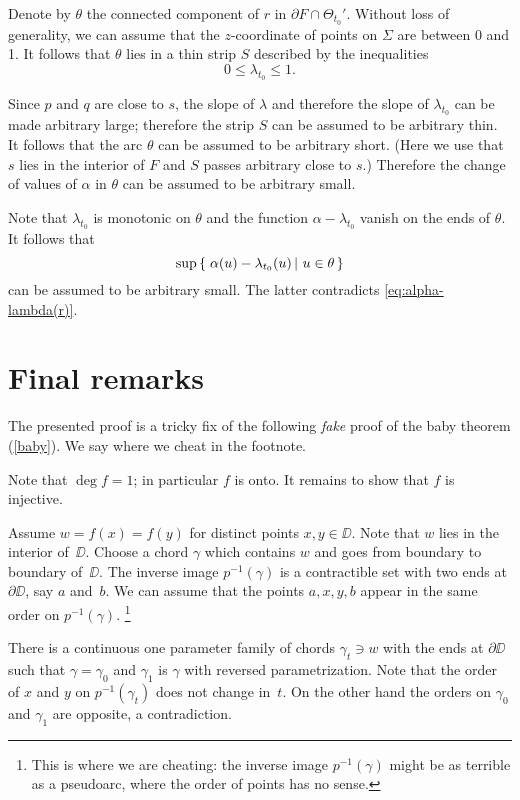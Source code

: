 \documentclass{article}
\begin{document}
Denote by $\theta$ the connected component of $r$ in $\partial F\cap \Theta_{t_0}'$.
Without loss of generality, we can assume that the $z$-coordinate of points on $\Sigma$ are between 0 and 1.
It follows that $\theta$ lies in a thin strip $S$ described by the inequalities
\[0\le \lambda_{t_0}\le 1.\]

Since $p$ and $q$ are close to $s$, 
 the slope of $\lambda$ and therefore the slope of $\lambda_{t_0}$ can be made arbitrary large;
therefore the strip $S$ can be assumed to be arbitrary thin.
It follows that the arc $\theta$ can be assumed to be  arbitrary short.
(Here we use that $s$ lies in the interior of $F$ and $S$ passes arbitrary close to $s$.)
Therefore the change of values of $\alpha$ in $\theta$ can be assumed to be arbitrary small.

Note that $\lambda_{t_0}$ is monotonic on $\theta$ and 
the function $\alpha-\lambda_{t_0}$ vanish on the ends of $\theta$.
It follows that 
\[\sup\set{\alpha(u)-\lambda_{t_0}(u)}{u\in\theta}\]
can be assumed to be arbitrary small.
The latter contradicts \ref{eq:alpha-lambda(r)}.
\qeds

\section{Final remarks}

The presented proof is a tricky fix of the following \emph{fake} proof of the baby theorem (\ref{baby}).
We say where we cheat in the footnote.

Note that $\deg f=1$;
in particular $f$ is onto.
It remains to show that $f$ is injective.

Assume $w=f(x)=f(y)$ for distinct points $x,y\in\DD$.
Note that $w$ lies in the interior of~$\DD$.
Choose a chord $\gamma$ which contains $w$ and goes 
from boundary to boundary of~$\DD$.
The inverse image $p^{-1}(\gamma)$ is a contractible set with two ends at $\partial\DD$, say $a$ and~$b$.
We can assume that the points $a,x,y,b$ appear in the same order on $p^{-1}(\gamma)$.%
\footnote{This is where we are cheating: the inverse image $p^{-1}(\gamma)$ might be as terrible as a pseudoarc, where the order of points has no sense.}

There is a continuous one parameter family of chords $\gamma_t\ni w$ with the ends at $\partial \DD$
such that $\gamma=\gamma_0$ and $\gamma_1$ is $\gamma$ with reversed parametrization.
Note that the order of $x$ and $y$ on $p^{-1}(\gamma_t)$ does not change in~$t$.
On the other hand the orders on $\gamma_0$ and $\gamma_1$ are opposite, a contradiction.\qeds
\end{document}

